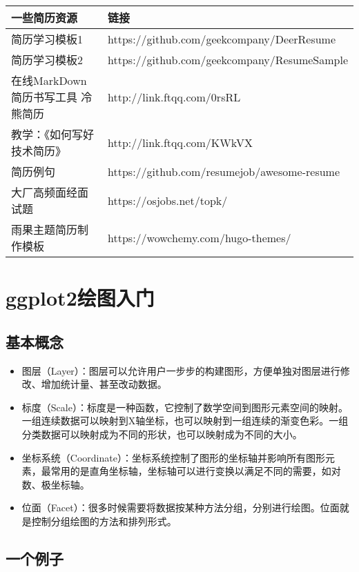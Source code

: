 \documentclass[
]{book}
\begin{document}
\begin{longtable}[]{@{}ll@{}}
\toprule
一些简历资源 & 链接 \\
\midrule
\endhead
简历学习模板1 & https://github.com/geekcompany/DeerResume \\
简历学习模板2 & https://github.com/geekcompany/ResumeSample \\
在线MarkDown简历书写工具 冷熊简历 & http://link.ftqq.com/0rsRL \\
教学：《如何写好技术简历》 & http://link.ftqq.com/KWkVX \\
简历例句 & https://github.com/resumejob/awesome-resume \\
大厂高频面经面试题 & https://osjobs.net/topk/ \\
雨果主题简历制作模板 & https://wowchemy.com/hugo-themes/ \\
\bottomrule
\end{longtable}

\hypertarget{ggplot2ux7ed8ux56feux5165ux95e8}{%
\section{ggplot2绘图入门}\label{ggplot2ux7ed8ux56feux5165ux95e8}}

\hypertarget{ux57faux672cux6982ux5ff5}{%
\subsection{基本概念}\label{ux57faux672cux6982ux5ff5}}

\begin{itemize}
\item
  图层（Layer）：图层可以允许用户一步步的构建图形，方便单独对图层进行修改、增加统计量、甚至改动数据。
\item
  标度（Scale）：标度是一种函数，它控制了数学空间到图形元素空间的映射。一组连续数据可以映射到X轴坐标，也可以映射到一组连续的渐变色彩。一组分类数据可以映射成为不同的形状，也可以映射成为不同的大小。
\item
  坐标系统（Coordinate）：坐标系统控制了图形的坐标轴并影响所有图形元素，最常用的是直角坐标轴，坐标轴可以进行变换以满足不同的需要，如对数、极坐标轴。
\item
  位面（Facet）：很多时候需要将数据按某种方法分组，分别进行绘图。位面就是控制分组绘图的方法和排列形式。
\end{itemize}

\hypertarget{ux4e00ux4e2aux4f8bux5b50}{%
\subsection{一个例子}\label{ux4e00ux4e2aux4f8bux5b50}}
\end{document}
